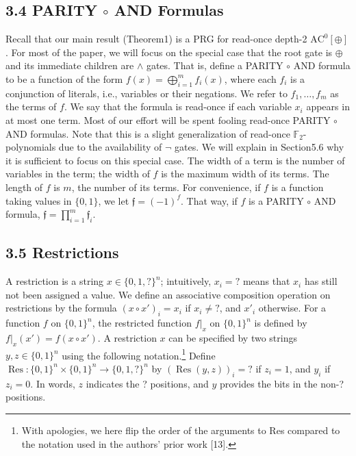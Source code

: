 \subsection*{3.4 PARITY $\circ$ AND Formulas}
Recall that our main result (Theorem1) is a PRG for read-once depth-2 $\mathrm{AC}^0[\oplus]$. For most of the paper, we will focus on the special case that the root gate is $\oplus$ and its immediate children are $\wedge$ gates. That is, define a PARITY $\circ$ AND formula to be a function of the form $f(x)=\bigoplus_{i=1}^mf_i(x)$, where each $f_i$ is a conjunction of literals, i.e., variables or their negations. We refer to $f_1,\ldots,f_m$ as the terms of $f$. We say that the formula is read-once if each variable $x_i$ appears in at most one term. Most of our effort will be spent fooling read-once PARITY $\circ$ AND formulas. Note that this is a slight generalization of read-once $\mathbb F_2$-polynomials due to the availability of $\neg$ gates. We will explain in Section5.6 why it is sufficient to focus on this special case.
The width of a term is the number of variables in the term; the width of $f$ is the maximum width of its terms. The length of $f$ is $m$, the number of its terms.
For convenience, if $f$ is a function taking values in $\{0,1\}$, we let $\mathfrak f=(-1)^f$. That way, if $f$ is a PARITY $\circ$ AND formula, $\mathfrak f=\prod_{i=1}^m\mathfrak f_i$.
\subsection*{3.5 Restrictions}
A restriction is a string $x\in\{0,1,?\}^n$; intuitively, $x_i=?$ means that $x_i$ has still not been assigned a value. We define an associative composition operation on restrictions by the formula $(x\circ x')_i=x_i$ if $x_i\ne?$, and $x'_i$ otherwise.
For a function $f$ on $\{0,1\}^n$, the restricted function $f|_x$ on $\{0,1\}^n$ is defined by $f|_x(x')=f(x\circ x')$.
A restriction $x$ can be specified by two strings $y,z\in\{0,1\}^n$ using the following notation.\footnote{With apologies, we here flip the order of the arguments to Res compared to the notation used in the authors' prior work [13].} Define $\operatorname{Res}:\{0,1\}^n\times\{0,1\}^n\to\{0,1,?\}^n$ by $(\operatorname{Res}(y,z))_i=?$ if $z_i=1$, and $y_i$ if $z_i=0$. In words, $z$ indicates the ? positions, and $y$ provides the bits in the non-? positions.
